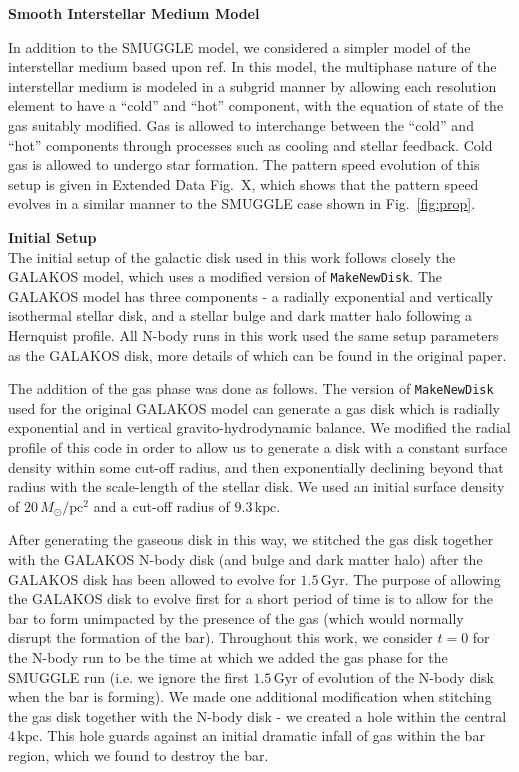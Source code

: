 \documentclass{natureprintstyle}
\begin{document}
\noindent
{\bf Smooth Interstellar Medium Model}
\\
\noindent

In addition to the SMUGGLE model, we considered a simpler model of the
interstellar medium based upon ref.\cite{2003MNRAS.339..289S} In this model,
the multiphase nature of the interstellar medium is modeled in a subgrid
manner by allowing each resolution element to have a ``cold'' and ``hot''
component, with the equation of state of the gas suitably modified. Gas is
allowed to interchange between the ``cold'' and ``hot'' components through
processes such as cooling and stellar feedback. Cold gas is allowed to undergo
star formation. The pattern speed evolution of this setup is given in Extended
Data Fig.~X, which shows that the pattern speed evolves in a similar manner to
the SMUGGLE case shown in Fig.~\ref{fig:prop}.

\vspace{12pt}

\noindent
{\bf Initial Setup}
\\
\noindent
The initial setup of the galactic disk used in this work follows closely the
GALAKOS model\cite{2020ApJ...890..117D}, which uses a modified version of
\texttt{MakeNewDisk}.\cite{2005MNRAS.361..776S} The GALAKOS model has three
components - a radially exponential and vertically isothermal stellar disk,
and a stellar bulge and dark matter halo following a Hernquist
profile.\cite{1990ApJ...356..359H} All N-body runs in this work used the same
setup parameters as the GALAKOS disk, more details of which can be found in
the original paper.

The addition of the gas phase was done as follows. The version of
\texttt{MakeNewDisk} used for the original GALAKOS model can generate a gas
disk which is radially exponential and in vertical gravito-hydrodynamic
balance. We modified the radial profile of this code in order to allow us to
generate a disk with a constant surface density within some cut-off radius,
and then exponentially declining beyond that radius with the scale-length of
the stellar disk. We used an initial surface density of
$20\,M_{\odot}/\textrm{pc}^2$ and a cut-off radius of $9.3\,\textrm{kpc}$.

After generating the gaseous disk in this way, we stitched the gas disk
together with the GALAKOS N-body disk (and bulge and dark matter halo) after
the GALAKOS disk has been allowed to evolve for $1.5\,\textrm{Gyr}$. The
purpose of allowing the GALAKOS disk to evolve first for a short period of
time is to allow for the bar to form unimpacted by the presence of the gas
(which would normally disrupt the formation of the bar). Throughout this work,
we consider $t=0$ for the N-body run to be the time at which we added the gas
phase for the SMUGGLE run (i.e. we ignore the first $1.5\,\textrm{Gyr}$ of
evolution of the N-body disk when the bar is forming). We made one additional
modification when stitching the gas disk together with the N-body disk - we
created a hole within the central $4\,\textrm{kpc}$. This hole guards
against an initial dramatic infall of gas within the bar region, which we
found to destroy the bar.
\end{document}
